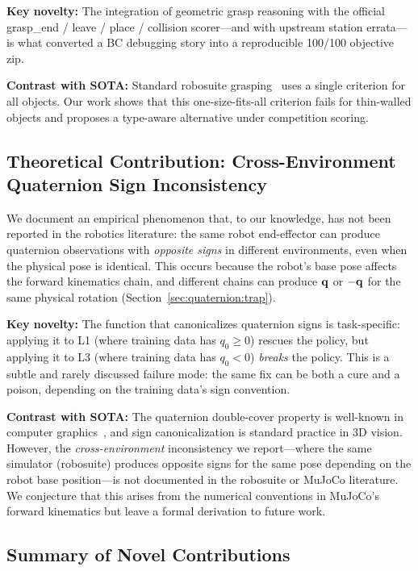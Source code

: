 \textbf{Key novelty:} The integration of geometric grasp reasoning with the official grasp\_end / leave / place / collision scorer---and with upstream station errata---is what converted a BC debugging story into a reproducible 100/100 objective zip.

\textbf{Contrast with SOTA:} Standard robosuite grasping~\cite{robosuite} uses a single  criterion for all objects. Our work shows that this one-size-fits-all criterion fails for thin-walled objects and proposes a type-aware alternative under competition scoring.

\subsection{Theoretical Contribution: Cross-Environment Quaternion Sign Inconsistency}
\label{sec:novelty:theory}

We document an empirical phenomenon that, to our knowledge, has not been reported in the robotics literature: the same robot end-effector can produce quaternion observations with \emph{opposite signs} in different environments, even when the physical pose is identical. This occurs because the robot's base pose affects the forward kinematics chain, and different chains can produce $\mathbf{q}$ or $-\mathbf{q}$ for the same physical rotation (Section~\ref{sec:quaternion:trap}).

\textbf{Key novelty:} The  function that canonicalizes quaternion signs is task-specific: applying it to L1 (where training data has $q_0 \geq 0$) rescues the policy, but applying it to L3 (where training data has $q_0 < 0$) \emph{breaks} the policy. This is a subtle and rarely discussed failure mode: the same fix can be both a cure and a poison, depending on the training data's sign convention.

\textbf{Contrast with SOTA:} The quaternion double-cover property is well-known in computer graphics~\cite{shoemake1985animating}, and sign canonicalization is standard practice in 3D vision. However, the \emph{cross-environment} inconsistency we report---where the same simulator (robosuite) produces opposite signs for the same pose depending on the robot base position---is not documented in the robosuite or MuJoCo literature. We conjecture that this arises from the numerical conventions in MuJoCo's forward kinematics but leave a formal derivation to future work.

\subsection{Summary of Novel Contributions}

